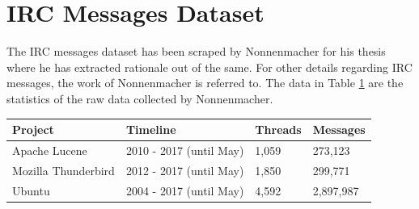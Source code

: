 \documentclass[a4paper,12pt,twoside]{report}
\begin{document}

\section{IRC Messages Dataset}

The IRC messages dataset has been scraped by Nonnenmacher \cite{Nonnenmacher2017} for his thesis where he has extracted rationale out of the same. For other details regarding IRC messages, the work of Nonnenmacher \cite{Nonnenmacher2017} is referred to. The data in Table \ref{tab:rawIRCMessages} are the statistics of the raw data collected by Nonnenmacher. 

\begin{table} %
    \centering
    \begin{adjustbox}{max width=\columnwidth}
    \def\arraystretch{1} %
    \begin{tabular}{p{4cm} p{5cm} p{2cm} p{3cm}}
        \toprule
        \textbf{Project} & \textbf{Timeline} & \textbf{Threads} & \textbf{Messages}\\
        \midrule
			Apache Lucene & 2010 - 2017 (until May) & 1,059 & 273,123\\
			Mozilla Thunderbird & 2012 - 2017 (until May) & 1,850 & 299,771\\ 
			Ubuntu & 2004 - 2017 (until May) & 4,592 & 2,897,987\\
        \midrule
    \end{tabular}
    \end{adjustbox}
    \label{tab:rawIRCMessages}
\end{table}
\end{document}
